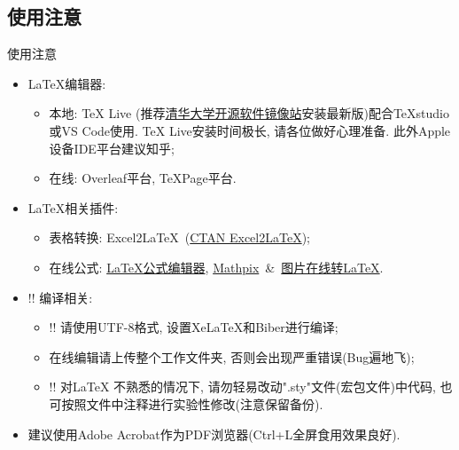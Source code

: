 \documentclass[hyperref, UTF8, CJK, aspectratio=169]{beamer}
\begin{document}
\subsection{使用注意}
\begin{frame}{使用注意}
	\begin{itemize}
		\item<1-> \LaTeX 编辑器:
		\begin{itemize}
			\item<1-> 本地: TeX Live (推荐\href{https://mirrors.tuna.tsinghua.edu.cn/CTAN/systems/texlive/Images/}{\color{scublue}清华大学开源软件镜像站}安装最新版)配合TeXstudio或VS Code使用. TeX Live安装时间极长, 请各位做好心理准备. 此外Apple设备IDE平台建议知乎;
			\item<1-> 在线: Overleaf平台, TeXPage平台.
		\end{itemize}
		\item<2-> \LaTeX 相关插件:
		\begin{itemize}
			\item<2-> 表格转换: Excel2\LaTeX~(\href{https://www.ctan.org/tex-archive/support/excel2latex/}{\color{scublue}CTAN Excel2\LaTeX});
			\item<2-> 在线公式: \href{https://www.latexlive.com/}{\color{scublue}LaTeX公式编辑器}, \href{https://mathpix.com/}{\color{scublue}
				Mathpix}~\&~\href{https://mathf.itewqq.cn/}{\color{scublue}图片在线转LaTeX}.
		\end{itemize}
		\item<3-> \color{scured}!! 编译相关:
		\begin{itemize}
			\item<3-> \color{scured}!! 请使用UTF-8格式, 设置XeLaTeX和Biber进行编译;
			\item<3-> 在线编辑请上传整个工作文件夹, 否则会出现严重错误(Bug遍地飞);
			\item<3-> \color{scured}!! 对\LaTeX{} 不熟悉的情况下, 请勿轻易改动".sty"文件(宏包文件)中代码, 也可按照文件中注释进行实验性修改(注意保留备份).
		\end{itemize}
		\item<4-> \color{scured} 建议使用Adobe Acrobat作为PDF浏览器(Ctrl+L全屏食用效果良好).
	\end{itemize}
\end{frame}
\end{document}
